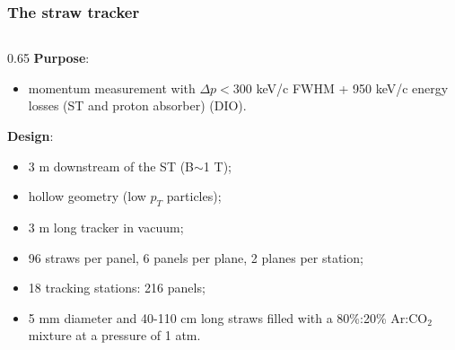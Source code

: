 \documentclass{beamer}
\begin{document}
\begin{frame}
    \frametitle{The straw tracker}
    \begin{columns}
    \begin{column}{0.65 \framewidth}
\textbf{Purpose}:
\begin{itemize}
\item momentum measurement with $\Delta p<300$ keV/c FWHM + 950 keV/c energy losses (ST and proton absorber) (DIO). 
\end{itemize}
\textbf{Design}:
\begin{itemize}
    \item 3 m downstream of the ST (B$\sim$1 T);
    \item hollow geometry (low $p_T $ particles);
    \item 3 m long tracker in vacuum;
    \item 96 straws per panel, 6 panels per plane, 2 planes per station;
        \item 18 tracking stations: 216 panels;
    \item 5 mm diameter and 40-110 cm long straws filled with a 80\%:20\% Ar:CO$_2$ mixture at a pressure of 1 atm.
       
        
        
    \end{itemize}
    

\end{column}
\end{columns}
\end{frame}
\end{document}
